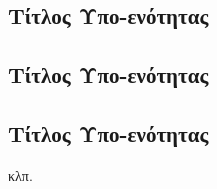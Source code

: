 \subsection{Τίτλος Υπο-ενότητας}

\subsection{Τίτλος Υπο-ενότητας}

\subsection{Τίτλος Υπο-ενότητας}

κλπ.



